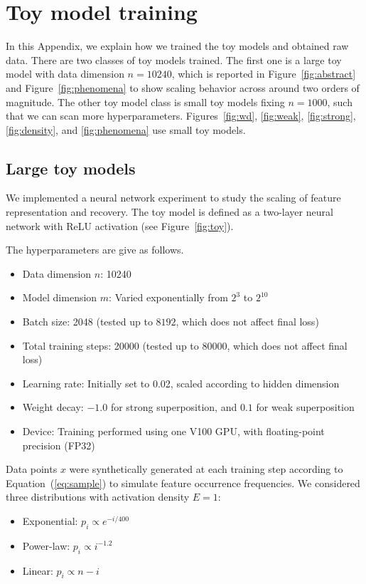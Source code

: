 \documentclass{article}
\begin{document}
\section{Toy model training}\label{app:toytrain}
In this Appendix, we explain how we trained the toy models and obtained raw data. There are two classes of toy models trained. The first one is a large toy model with data dimension $n = 10240$, which is reported in Figure~\ref{fig:abstract} and Figure~\ref{fig:phenomena} to show scaling behavior across around two orders of magnitude. The other toy model class is small toy models fixing $n = 1000$, such that we can scan more hyperparameters. Figures~\ref{fig:wd}, \ref{fig:weak}, \ref{fig:strong}, \ref{fig:density}, and \ref{fig:phenomena} use small toy models. 

\subsection{Large toy models}\label{app:large}


We implemented a neural network experiment to study the scaling of feature representation and recovery. The toy model is defined as a two-layer neural network with ReLU activation (see Figure~\ref{fig:toy}).

The hyperparameters are give as follows.
\begin{itemize}
    \item Data dimension $n$: 10240
    \item Model dimension $m$: Varied exponentially from $2^3$ to $2^{10}$
    \item Batch size: 2048 (tested up to $8192$, which does not affect final loss)
    \item Total training steps: 20000 (tested up to $80000$, which does not affect final loss)
    \item Learning rate: Initially set to 0.02, scaled according to hidden dimension
    \item Weight decay: $-1.0$ for strong superposition, and $0.1$ for weak superposition
    \item Device: Training performed using one V100 GPU, with floating-point precision (FP32)
\end{itemize}

Data points $x$ were synthetically generated at each training step according to Equation~(\ref{eq:sample}) to simulate feature occurrence frequencies. We considered three distributions with activation density $E = 1$:
\begin{itemize}
    \item Exponential: $p_i \propto e^{-i/400}$
    \item Power-law: $p_i \propto i^{-1.2}$
    \item Linear: $p_i \propto n - i$
\end{itemize}
\end{document}

